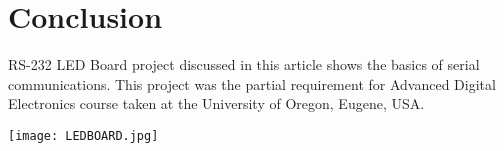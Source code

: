 \documentclass{article}
\begin{document}
\section{Conclusion}
RS-232 LED Board project discussed in this article shows the basics
of serial communications. This project was the partial requirement
for Advanced Digital Electronics course taken at the University of
Oregon, Eugene, USA.


\vspace*{1cm}
\begin{center}
\texttt{[image: LEDBOARD.jpg]}
\end{center}
\end{document}

